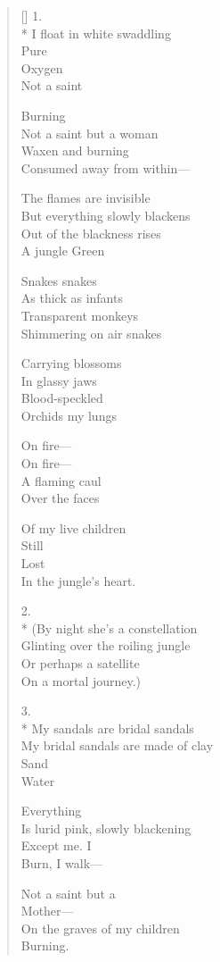 \label{ch:neardeath}
\settowidth{\versewidth}{My bridal sandals are made of clay}
\begin{verse}[\versewidth]
1.\\*
I float in white swaddling\\
Pure\\
Oxygen\\
Not a saint

Burning\\
Not a saint but a woman\\
Waxen and burning\\
Consumed away from within---

The flames are invisible\\
But everything slowly blackens\\
Out of the blackness rises\\
A jungle \quad Green

Snakes   snakes\\
As thick as infants\\
Transparent monkeys\\
Shimmering on air \quad snakes

Carrying blossoms\\
In glassy jaws\\
Blood-speckled\\
Orchids \quad my lungs

On fire---\\
On fire---\\
A flaming caul\\
Over the faces

Of my live children\\
Still\\
Lost\\
In the jungle's heart.


2.\\*
(By night she's a constellation\\
Glinting over the roiling jungle\\
Or perhaps a satellite\\
On a mortal journey.)

3.\\*
My sandals are bridal sandals\\
My bridal sandals are made of clay\\
Sand\\
Water

Everything\\
Is lurid pink, slowly blackening\\
Except me.  I\\
Burn, I walk---

Not a saint but a\\
Mother---\\
On the graves of my children\\
Burning.
\end{verse}

